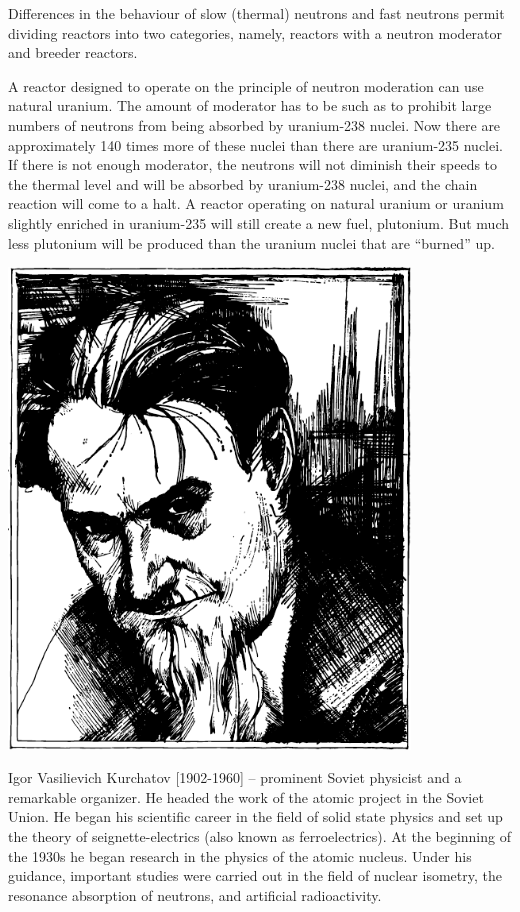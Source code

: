 Differences in the behaviour of slow (thermal) neu­trons and fast neutrons permit dividing reactors into two categories, namely, reactors with a neutron modera­tor and breeder reactors.

A reactor designed to operate on the principle of neu­tron moderation can use natural uranium. The amount of moderator has to be such as to prohibit large numbers of neutrons from being absorbed by uranium-238 nuclei. Now there are approximately 140 times more of these nuclei than there are uranium-235 nuclei. If there is not enough moderator, the neutrons will not diminish their speeds to the thermal level and will be absorbed by ura­nium-238 nuclei, and the chain reaction will come to a halt. A reactor operating on natural uranium or uranium slightly enriched in uranium-235 will still create a new fuel, plutonium. But much less plutonium will be pro­duced than the uranium nuclei that are ``burned'' up.

\newpage
\begin{center}
\includegraphics[width=0.8\textwidth]{figures/kurchatov.pdf}
\end{center}
{\small \textsf{{Igor Vasilievich Kurchatov [1902-1960]}} -- \textsf{\footnotesize prominent Soviet phys­icist and a remarkable organizer. He headed the work of the atom­ic project in the Soviet Union. He began his scientific career in the field of solid state physics and set up the theory of seignette-electrics (also known as ferroelectrics). At the beginning of the 1930s he began research in the physics of the atomic nucleus. Under his guidance, important studies were carried out in the field of nuclear isometry, the resonance absorption of neutrons, and arti­ficial radioactivity.}}

